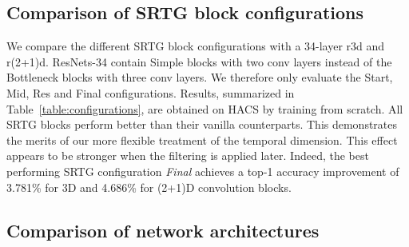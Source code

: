 \documentclass[final,5p,times,twocolumn]{elsarticle}
\begin{document}
\subsection{Comparison of SRTG block configurations}
\label{sec:variants_comp}
We compare the different SRTG block configurations with a 34-layer r3d and r(2+1)d. ResNets-34 contain Simple blocks with two conv layers instead of the Bottleneck blocks with three conv layers. We therefore only evaluate the Start, Mid, Res and Final configurations. Results, summarized in Table~\ref{table:configurations}, are obtained on HACS by training from scratch. All SRTG blocks perform better than their vanilla counterparts. This demonstrates the merits of our more flexible treatment of the temporal dimension. This effect appears to be stronger when the filtering is applied later. Indeed, the best performing SRTG configuration \textit{Final} achieves a top-1 accuracy improvement of 3.781\% for 3D and 4.686\% for (2+1)D convolution blocks.

\begin{table}[!htb]
\caption{\label{tab1}Comparison of r3d-34 with SRTG configurations on HACS.}
\centering
{}
\label{table:configurations}
\vspace{-1mm}
\end{table}


\subsection{Comparison of network architectures}
\label{sec:results::subsec:net}
\end{document}
